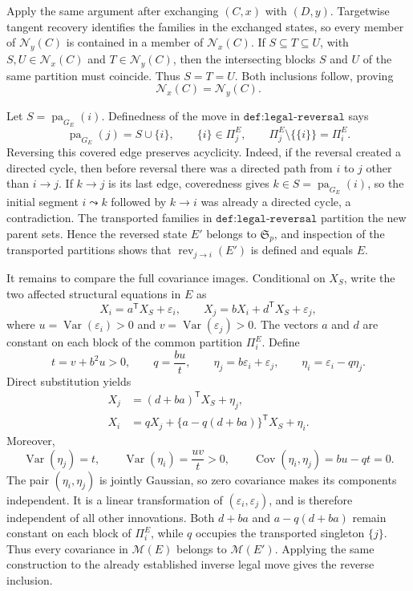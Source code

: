 Apply the same argument after exchanging \((C,x)\) with \((D,y)\). Targetwise tangent recovery identifies the families in the exchanged states, so every member of \(\mathcal N_y(C)\) is contained in a member of \(\mathcal N_x(C)\). If \(S\subseteq T\subseteq U\), with \(S,U\in\mathcal N_x(C)\) and \(T\in\mathcal N_y(C)\), then the intersecting blocks \(S\) and \(U\) of the same partition must coincide. Thus \(S=T=U\). Both inclusions follow, proving
\[
 \mathcal N_x(C)=\mathcal N_y(C).
\]

Let \(S=\operatorname{pa}_{G_E}(i)\). Definedness of the move in \(\texttt{def:legal-reversal}\) says
\[
 \operatorname{pa}_{G_E}(j)=S\cup\{i\},
 \qquad
 \{i\}\in\Pi^E_j,
 \qquad
 \Pi^E_j\setminus\{\{i\}\}=\Pi^E_i.
\]
Reversing this covered edge preserves acyclicity. Indeed, if the reversal created a directed cycle, then before reversal there was a directed path from \(i\) to \(j\) other than \(i\to j\). If \(k\to j\) is its last edge, coveredness gives \(k\in S=\operatorname{pa}_{G_E}(i)\), so the initial segment \(i\leadsto k\) followed by \(k\to i\) was already a directed cycle, a contradiction. The transported families in \(\texttt{def:legal-reversal}\) partition the new parent sets. Hence the reversed state \(E'\) belongs to \(\mathfrak S_p\), and inspection of the transported partitions shows that \(\operatorname{rev}_{j\to i}(E')\) is defined and equals \(E\).

It remains to compare the full covariance images. Conditional on \(X_S\), write the two affected structural equations in \(E\) as
\[
 X_i=a^{\mathsf T}X_S+\varepsilon_i,
 \qquad
 X_j=bX_i+d^{\mathsf T}X_S+\varepsilon_j,
\]
where \(u=\operatorname{Var}(\varepsilon_i)>0\) and \(v=\operatorname{Var}(\varepsilon_j)>0\). The vectors \(a\) and \(d\) are constant on each block of the common partition \(\Pi^E_i\). Define
\[
 t=v+b^2u>0,
 \qquad q=\frac{bu}{t},
 \qquad \eta_j=b\varepsilon_i+\varepsilon_j,
 \qquad \eta_i=\varepsilon_i-q\eta_j.
\]
Direct substitution yields
\[
 \begin{aligned}
 X_j&=(d+ba)^{\mathsf T}X_S+\eta_j,\\
 X_i&=qX_j+\{a-q(d+ba)\}^{\mathsf T}X_S+\eta_i.
 \end{aligned}
\]
Moreover,
\[
 \operatorname{Var}(\eta_j)=t,
 \qquad
 \operatorname{Var}(\eta_i)=\frac{uv}{t}>0,
 \qquad
 \operatorname{Cov}(\eta_i,\eta_j)=bu-qt=0.
\]
The pair \((\eta_i,\eta_j)\) is jointly Gaussian, so zero covariance makes its components independent. It is a linear transformation of \((\varepsilon_i,\varepsilon_j)\), and is therefore independent of all other innovations. Both \(d+ba\) and \(a-q(d+ba)\) remain constant on each block of \(\Pi^E_i\), while \(q\) occupies the transported singleton \(\{j\}\). Thus every covariance in \(\mathcal M(E)\) belongs to \(\mathcal M(E')\). Applying the same construction to the already established inverse legal move gives the reverse inclusion.

